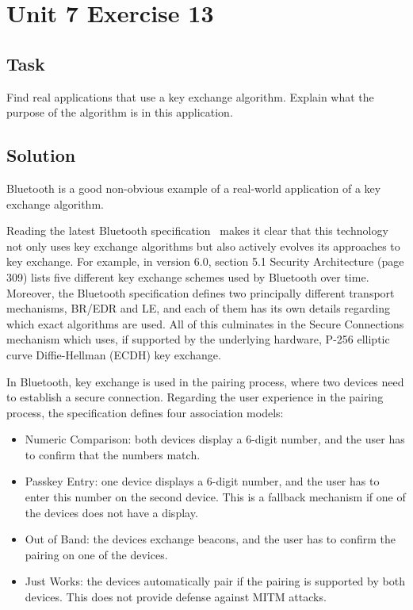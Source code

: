 \section{Unit 7 Exercise 13}

\subsection{Task}
Find real applications that use a key exchange algorithm.
Explain what the purpose of the algorithm is in this application.

\subsection{Solution}

Bluetooth is a good non-obvious example of a real-world application of a key exchange algorithm.

Reading the latest Bluetooth specification~\cite{bluetooth} makes it clear that this technology not only uses key exchange algorithms but also actively evolves its approaches to key exchange.
For example, in version 6.0, section 5.1 Security Architecture (page 309) lists five different key exchange schemes used by Bluetooth over time.
Moreover, the Bluetooth specification defines two principally different transport mechanisms, BR/EDR and LE, and each of them has its own details regarding which exact algorithms are used.
All of this culminates in the Secure Connections mechanism which uses, if supported by the underlying hardware, P-256 elliptic curve Diffie-Hellman (ECDH) key exchange.

In Bluetooth, key exchange is used in the pairing process, where two devices need to establish a secure connection.
Regarding the user experience in the pairing process, the specification defines four association models:
\begin{itemize}
    \item Numeric Comparison: both devices display a 6-digit number, and the user has to confirm that the numbers match.
    \item Passkey Entry: one device displays a 6-digit number, and the user has to enter this number on the second device. This is a fallback mechanism if one of the devices does not have a display.
    \item Out of Band: the devices exchange beacons, and the user has to confirm the pairing on one of the devices.
    \item Just Works: the devices automatically pair if the pairing is supported by both devices. This does not provide defense against MITM attacks.
\end{itemize}

